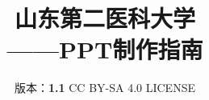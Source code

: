

\title{%
    {\Huge\textbf{山东第二医科大学\\[5pt]——PPT制作指南}}%
}
\author{%
    版本：\textbf{1.1} \qquad%
    CC BY-SA 4.0 LICENSE \qquad%
    }
\date{\CurrentCustomTime}
\maketitle

\renewcommand{\thefootnote}{\arabic{footnote}}

